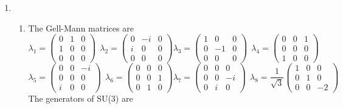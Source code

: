 \documentclass[12pt]{article}
\begin{document}
\begin{enumerate}
  \item \begin{enumerate}
    \item The Gell-Mann matrices are 
    $$ \lambda_1 = \begin{pmatrix}
      0&1&0 \\ 1&0&0 \\ 0&0&0 
    \end{pmatrix} \ \ \lambda_2 = \begin{pmatrix}
      0&-i&0 \\ i&0&0 \\ 0&0&0 
    \end{pmatrix} \lambda_3 = \begin{pmatrix}
      1&0&0 \\ 0&-1&0 \\ 0&0&0 
    \end{pmatrix} \ \ \lambda_4 = \begin{pmatrix}
      0&0&1 \\ 0&0&0 \\ 1&0&0  
    \end{pmatrix}  $$
    $$ \lambda_5 = \begin{pmatrix}
      0&0&-i \\ 0&0&0 \\ i&0&0 
    \end{pmatrix} \ \ \lambda_6 = \begin{pmatrix}
      0&0&0 \\ 0&0&1 \\ 0&1&0 
    \end{pmatrix} \lambda_7 = \begin{pmatrix}
      0&0&0 \\ 0&0&-i \\ 0&i&0 
    \end{pmatrix} \ \ \lambda_8 = \frac{1}{\sqrt{3} }\begin{pmatrix}
      1&0&0 \\ 0&1&0 \\ 0&0&-2  
    \end{pmatrix}  $$
    The generators of SU(3) are 
  

\end{enumerate}
\end{enumerate}
\end{document}
